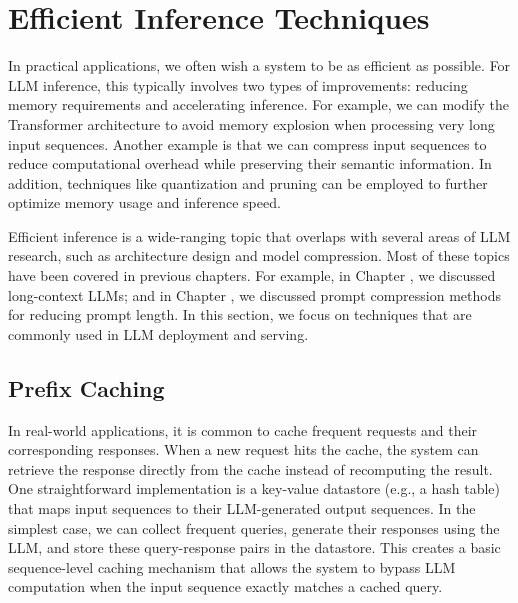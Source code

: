 
\section{Efficient Inference Techniques}

In practical applications, we often wish a system to be as efficient as possible. For LLM inference, this typically involves two types of improvements: reducing memory requirements and accelerating inference. For example, we can modify the Transformer architecture to avoid memory explosion when processing very long input sequences. Another example is that we can compress input sequences to reduce computational overhead while preserving their semantic information. In addition, techniques like quantization and pruning can be employed to further optimize memory usage and inference speed.

Efficient inference is a wide-ranging topic that overlaps with several areas of LLM research, such as architecture design and model compression. Most of these topics have been covered in previous chapters. For example, in Chapter \ChapterLLM, we discussed long-context LLMs; and in Chapter \ChapterLLMPrompting, we discussed prompt compression methods for reducing prompt length. In this section, we focus on techniques that are commonly used in LLM deployment and serving.

\subsection{Prefix Caching}

In real-world applications, it is common to cache frequent requests and their corresponding responses. When a new request hits the cache, the system can retrieve the response directly from the cache instead of recomputing the result. One straightforward implementation is a key-value datastore (e.g., a hash table) that maps input sequences to their LLM-generated output sequences. In the simplest case, we can collect frequent queries, generate their responses using the LLM, and store these query-response pairs in the datastore. This creates a basic sequence-level caching mechanism that allows the system to bypass LLM computation when the input sequence exactly matches a cached query.

